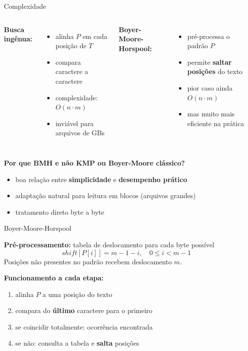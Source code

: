\documentclass{beamer}
\begin{document}
\begin{frame}{Complexidade}

\begin{columns}
    \textbf{Busca ingênua:}
    \begin{itemize}
        \item alinha $P$ em cada posição de $T$
        \item compara caractere a caractere
        \item complexidade: $O(n \cdot m)$
        \item inviável para arquivos de GBs
    \end{itemize}

    \textbf{Boyer-Moore-Horspool:}
    \begin{itemize}
        \item pré-processa o padrão $P$
        \item permite \textbf{saltar posições} do texto
        \item pior caso ainda $O(n \cdot m)$
        \item mas muito mais eficiente na prática
    \end{itemize}
\end{columns}

\vspace{0.5cm}

\textbf{Por que BMH e não KMP ou Boyer-Moore clássico?}
\begin{itemize}
    \item boa relação entre \textbf{simplicidade} e \textbf{desempenho prático}
    \item adaptação natural para leitura em blocos (arquivos grandes)
    \item tratamento direto byte a byte
\end{itemize}

\end{frame}


\begin{frame}{Boyer-Moore-Horspool}

\textbf{Pré-processamento:} tabela de deslocamento para cada byte possível
\[
shift[P[i]] = m - 1 - i, \quad 0 \leq i < m-1
\]
Posições não presentes no padrão recebem deslocamento $m$.

\vspace{0.2cm}

\textbf{Funcionamento a cada etapa:}
\begin{enumerate}
    \item alinha $P$ a uma posição do texto
    \item compara do \textbf{último} caractere para o primeiro
    \item se coincidir totalmente: ocorrência encontrada
    \item se não: consulta a tabela e \textbf{salta} posições
\end{enumerate}

\vspace{0.2cm}

\end{frame}
\end{document}
